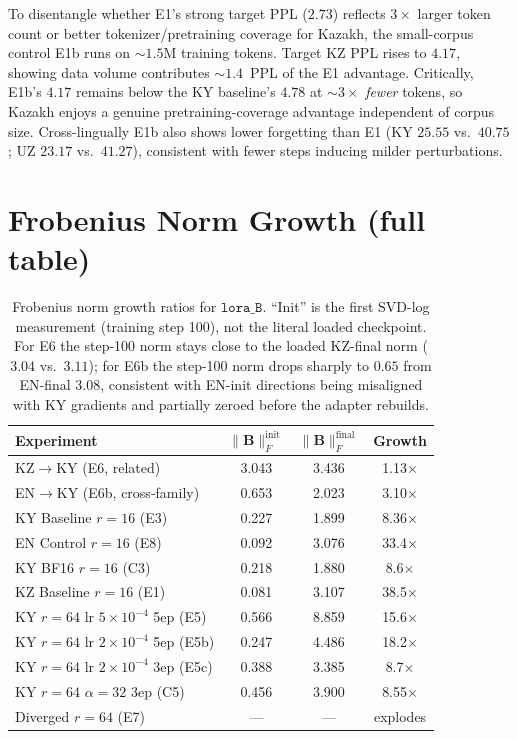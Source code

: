 \documentclass[11pt]{article}
\begin{document}
To disentangle whether E1's strong target PPL ($2.73$) reflects $3\times$ larger token count or better tokenizer/pretraining coverage for Kazakh, the small-corpus control E1b runs on $\sim 1.5$M training tokens. Target KZ PPL rises to $4.17$, showing data volume contributes $\sim 1.4$~PPL of the E1 advantage. Critically, E1b's $4.17$ remains below the KY baseline's $4.78$ at $\sim 3\times$ \emph{fewer} tokens, so Kazakh enjoys a genuine pretraining-coverage advantage independent of corpus size. Cross-lingually E1b also shows lower forgetting than E1 (KY $25.55$ vs.\ $40.75$; UZ $23.17$ vs.\ $41.27$), consistent with fewer steps inducing milder perturbations.

\section{Frobenius Norm Growth (full table)}
\label{app:frob}

\begin{table}[!htbp]
\centering
\small
\begin{tabular}{lccc}
\toprule
\textbf{Experiment} & $\|\mathbf{B}\|_F^{\text{init}}$ & $\|\mathbf{B}\|_F^{\text{final}}$ & \textbf{Growth} \\
\midrule
KZ$\rightarrow$KY (E6, related) & 3.043 & 3.436 & 1.13$\times$ \\
EN$\rightarrow$KY (E6b, cross-family) & 0.653 & 2.023 & 3.10$\times$ \\
KY Baseline $r{=}16$ (E3) & 0.227 & 1.899 & 8.36$\times$ \\
EN Control $r{=}16$ (E8) & 0.092 & 3.076 & 33.4$\times$ \\
KY BF16 $r{=}16$ (C3) & 0.218 & 1.880 & 8.6$\times$ \\
KZ Baseline $r{=}16$ (E1) & 0.081 & 3.107 & 38.5$\times$ \\
KY $r{=}64$ lr $5{\times}10^{-4}$ 5ep (E5) & 0.566 & 8.859 & 15.6$\times$ \\
KY $r{=}64$ lr $2{\times}10^{-4}$ 5ep (E5b) & 0.247 & 4.486 & 18.2$\times$ \\
KY $r{=}64$ lr $2{\times}10^{-4}$ 3ep (E5c) & 0.388 & 3.385 & 8.7$\times$ \\
KY $r{=}64$ $\alpha{=}32$ 3ep (C5) & 0.456 & 3.900 & 8.55$\times$ \\
Diverged $r{=}64$ (E7) & --- & --- & explodes \\
\bottomrule
\end{tabular}
\caption{Frobenius norm growth ratios for $\texttt{lora\_B}$. ``Init'' is the first SVD-log measurement (training step 100), not the literal loaded checkpoint. For E6 the step-100 norm stays close to the loaded KZ-final norm ($3.04$ vs.\ $3.11$); for E6b the step-100 norm drops sharply to $0.65$ from EN-final $3.08$, consistent with EN-init directions being misaligned with KY gradients and partially zeroed before the adapter rebuilds.}
\label{tab:frobenius}
\end{table}
\end{document}

